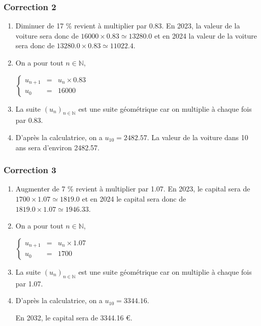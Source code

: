 \documentclass[15pt, mathserif]{beamer}
\newcommand{\N}{\mathbb{N}}			%
\newcommand{\st}[1]{$(#1_n)_{n \in \N}$}
\begin{document}
\begin{frame}
\vspace{-10mm}
	\frametitle{Correction 2}
\begin{enumerate} 
 	 \item Diminuer de 17 \% revient à multiplier par  0.83. En 2023, la valeur de la voiture sera donc de  $16000 \times  0.83\simeq 13280.0$ et en 2024 la valeur de la voiture sera donc de  $13280.0 \times  0.83\simeq 11022.4$.  
 	 \item On a pour tout $n \in \N$, 
 
 \hfil$\left\{\begin{array}{rcl} 
 u_{n+1} & = & u_n \times  0.83\\ u_0 & = &  16000\end{array} \right.$ 
 	 \item La suite \st{u} est une suite géométrique car on multiplie à chaque fois par  0.83. 
 	 \item D'après la calculatrice, on a $u_{10}=2482.57$. La valeur de la voiture dans 10 ans sera d'environ 2482.57. 
 \end{enumerate} 
 
 \end{frame}


\begin{frame}
\vspace{-10mm}
	\frametitle{Correction 3}
\begin{enumerate} 
 	 \item Augmenter de 7 \% revient à multiplier par  1.07. En 2023, le capital sera de $1700 \times  1.07\simeq 1819.0$ et en 2024 le capital sera donc de  $1819.0 \times  1.07\simeq 1946.33$.  
 	 \item On a pour tout $n \in \N$, 
 
 \hfil$\left\{\begin{array}{rcl} 
 u_{n+1} & = & u_n \times  1.07\\ u_0 & = &  1700\end{array} \right.$ 
 	 \item La suite \st{u} est une suite géométrique car on multiplie à chaque fois par  1.07. 
 	 \item D'après la calculatrice, on a $u_{10}=3344.16$. 
 
 En 2032, le capital sera de 3344.16 \euro. 
 \end{enumerate} 
 
 \end{frame}
\end{document}
